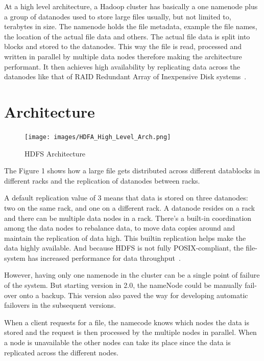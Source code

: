 At a high level architecture, a Hadoop cluster has basically a one
namenode plus a group of datanodes used to store large files usually,
but not limited to, terabytes in size. The namenode holds the file
metadata, example the file names, the location of the actual file data
and others. The actual file data is split into blocks and stored to
the datanodes. This way the file is read, processed and written in
parallel by multiple data nodes therefore making the architecture
performant. It then achieves high availability by replicating data
across the datanodes like that of RAID Redundant Array of Inexpensive
Disk systems~\cite{hid-sp18-506-hdfs}.
 
\section{Architecture} 

\begin{figure}[!ht]
\centering\texttt{[image: images/HDFA\_High\_Level\_Arch.png]}
  \caption{HDFS Architecture}\label{f:hdfs-level-arch}
\end{figure}

The Figure 1 shows how a large file gets distributed across different
datablocks in different racks and the replication of datanodes between
racks.
 
A default replication value of 3 means that data is stored on three
datanodes: two on the same rack, and one on a different rack. A
datanode resides on a rack and there can be multiple data nodes in a
rack. There's a built-in coordination among the data nodes to
rebalance data, to move data copies around and maintain the
replication of data high. This builtin replication helps make the data
highly available. And because HDFS is not fully POSIX-compliant, the
file-system has increased performance for data
throughput~\cite{hid-sp18-506-hdfs2}.

However, having only one namenode in the cluster can be a single point
of failure of the system. But starting version in 2.0, the nameNode
could be manually fail-over onto a backup. This version also paved the
way for developing automatic failovers in the subsequent versions.

When a client requests for a file, the namecode knows which nodes the
data is stored and the request is then processed by the multiple nodes
in parallel. When a node is unavailable the other nodes can take its
place since the data is replicated across the different nodes.

